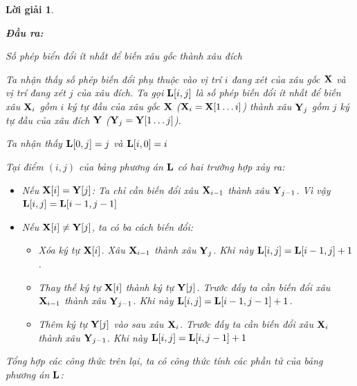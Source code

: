 \documentclass[14pt, a4paper]{article}
\theoremstyle{sltheorem}
\theoremstyle{soltheorem}
\newtheorem*{loigiai}{Lời giải}
\begin{document}
\begin{loigiai}
\begin{itemize} [label={$-$}]
            \textbf{Đầu ra:}

            Số phép biển đổi ít nhất để biến xâu gốc thành xâu đích

        Ta nhận thấy số phép biến đổi phụ thuộc vào vị trí $i$ đang xét của xâu gốc $\bold{X}$ và vị trí đang xét $j$ của xâu đích.
        Ta gọi $\bold{L}\lbrack i, j \rbrack$ là số phép biến đổi ít nhất để biến xâu $\bold{X}_i$ gồm $i$ ký tự đầu của xâu gốc $\bold{X}$ ($\bold{X}_i = \bold{X}\lbrack 1 \dots i \rbrack$)
        thành xâu $\bold{Y}_j$ gồm $j$ ký tự đầu của xâu đích $\bold{Y}$ ($\bold{Y}_j=\bold{Y} \lbrack 1 \dots j \rbrack$).
        
        Ta nhận thấy $\bold{L}\lbrack 0, j \rbrack=j$ và $\bold{L}\lbrack i, 0 \rbrack=i$

        Tại điểm $(i, j)$ của bảng phương án $\bold{L}$ có hai trường hợp xảy ra:

        \begin{itemize}
            \item Nếu $\bold{X} \lbrack i \rbrack = \bold{Y} \lbrack j \rbrack$: Ta chỉ cần biến đổi xâu $\bold{X}_{i-1}$ thành xâu $\bold{Y}_{j-1}$.
            Vì vậy $\bold{L}\lbrack i, j \rbrack = \bold{L}\lbrack i-1, j-1 \rbrack$
            \item Nếu $\bold{X} \lbrack i \rbrack \neq \bold{Y} \lbrack j \rbrack$, ta có ba cách biến đổi:
            \begin{itemize}
                \item Xóa ký tự $\bold{X} \lbrack i \rbrack$. Xâu $\bold{X}_{i-1}$ thành xâu $\bold{Y}_j$. Khi này $\bold{L}\lbrack i, j \rbrack=\bold{L} \lbrack i-1, j \rbrack + 1$.
                \item Thay thế ký tự $\bold{X} \lbrack i \rbrack$ thành ký tự $\bold{Y} \lbrack j \rbrack$.
                Trước đấy ta cần biến đổi xâu $\bold{X}_{i-1}$ thành xâu $\bold{Y}_{j-1}$. Khi này $\bold{L} \lbrack i, j \rbrack = \bold{L} \lbrack i-1, j-1 \rbrack + 1$.
                \item Thêm ký tự $\bold{Y} \lbrack j \rbrack$ vào sau xâu $\bold{X}_i$. Trước đấy ta cần biến đổi xâu $\bold{X}_{i}$ thành xâu $\bold{Y}_{j-1}$.
                Khi này $\bold{L} \lbrack i, j \rbrack = \bold{L} \lbrack i, j-1 \rbrack + 1$
            \end{itemize}
        \end{itemize}

        Tổng hợp các công thức trên lại, ta có công thức tính các phần tử của bảng phương án $\bold{L}$:


\end{itemize}
\end{loigiai}
\end{document}
